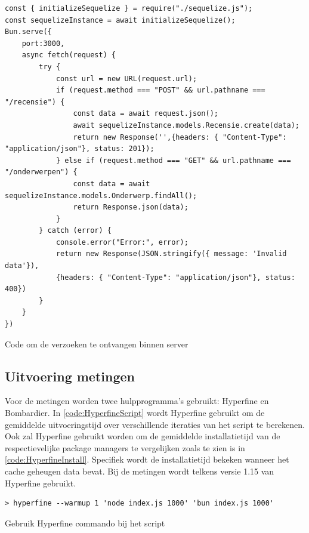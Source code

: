 \begin{listing}[H]
  \centering
  \begin{verbatim}
const { initializeSequelize } = require("./sequelize.js");
const sequelizeInstance = await initializeSequelize();
Bun.serve({
    port:3000,
    async fetch(request) {
        try {
            const url = new URL(request.url);
            if (request.method === "POST" && url.pathname === "/recensie") {
                const data = await request.json();
                await sequelizeInstance.models.Recensie.create(data);
                return new Response('',{headers: { "Content-Type": "application/json"}, status: 201});
            } else if (request.method === "GET" && url.pathname === "/onderwerpen") {
                const data = await sequelizeInstance.models.Onderwerp.findAll();
                return Response.json(data);
            }
        } catch (error) {
            console.error("Error:", error);
            return new Response(JSON.stringify({ message: 'Invalid data'}), 
            {headers: { "Content-Type": "application/json"}, status: 400})
        }
    }
})
\end{verbatim}
\caption{\label{code:BunServer}Code om de verzoeken te ontvangen binnen server}
\end{listing}
\subsection{Uitvoering metingen}
Voor de metingen worden twee hulpprogramma's gebruikt: Hyperfine en Bombardier.
In \ref{code:HyperfineScript} wordt Hyperfine gebruikt om de gemiddelde uitvoeringstijd over verschillende iteraties van het script te berekenen.
Ook zal Hyperfine gebruikt worden om de gemiddelde installatietijd van de respectievelijke package managers te vergelijken zoals 
te zien is in \ref{code:HyperfineInstall}. Specifiek wordt de installatietijd bekeken wanneer het cache geheugen data bevat.
Bij de metingen wordt telkens versie 1.15 van Hyperfine gebruikt.
\begin{listing}[H]
  \centering
  \begin{verbatim}
> hyperfine --warmup 1 'node index.js 1000' 'bun index.js 1000'
      \end{verbatim}
      \caption{\label{code:HyperfineScript}Gebruik Hyperfine commando bij het script}
\end{listing}

